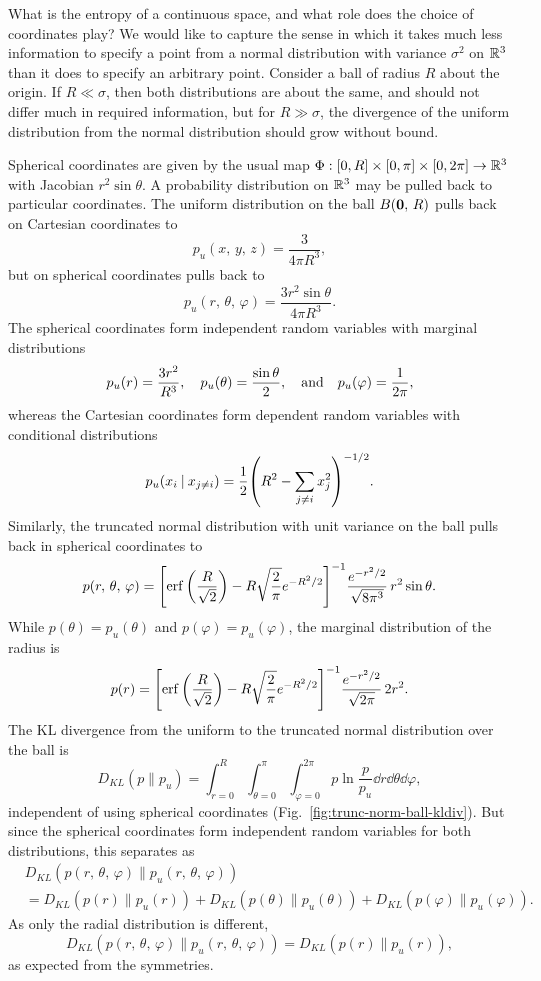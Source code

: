 \documentclass[../notebook.tex]{subfiles}
\begin{document}

What is the entropy of a continuous space, and what role does the choice of
coordinates play? We would like to capture the sense in which it takes much less
information to specify a point from a normal distribution with variance
$\sigma^2$ on $\mathbb{R}^3$ than it does to specify an arbitrary point. Consider a
ball of radius $R$ about the origin. If $R \ll \sigma$, then both distributions
are about the same, and should not differ much in required information, but for
$R \gg \sigma$, the divergence of the uniform distribution from the normal
distribution should grow without bound.

Spherical coordinates are given by the usual map $\Phi:[0,R] \times [0,\pi]
\times [0,2\pi] \to \mathbb{R}^3$ with Jacobian $r^2 \sin\theta$. A probability
distribution on $\mathbb{R}^3$ may be pulled back to particular coordinates. The
uniform distribution on the ball $B(\vb{0},\, R)$ pulls back on Cartesian
coordinates to
\[
  p_u(x,\, y,\, z)
  = \frac{3}{4\pi R^3},
\]
but on spherical coordinates pulls back to
\[
  p_u(r,\, \theta,\, \varphi)
  = \frac{3r^2 \sin\theta}{4\pi R^3}.
\]
The spherical coordinates form independent random variables with marginal
distributions
\[
  p_u(r)
  = \frac{3r^2}{R^3} \qc
  p_u(\theta)
  = \frac{\sin\theta}{2}, \qand
  p_u(\varphi)
  = \frac{1}{2\pi},
\]
whereas the Cartesian coordinates form dependent random variables with
conditional distributions
\[
  p_u(x_i \mathbin{|} x_{j \ne i})
  = \frac{1}{2}{\qty(R^2 - \sum_{j \ne i} x_j^2)}^{-1/2}.
\]
Similarly, the truncated normal distribution with unit variance on the ball
pulls back in spherical coordinates to
\[
  p(r,\, \theta,\, \varphi)
  = {\qty[\mathop{\mathrm{erf}}\qty(\frac{R}{\sqrt{2}})
  - R\sqrt{\frac{2}{\pi}}e^{-R^2 / 2}]}^{-1}
  \frac{e^{-r^2 / 2}}{\sqrt{8\pi^3}}\, r^2 \sin\theta.
\]
While $p(\theta) = p_u(\theta)$ and $p(\varphi) = p_u(\varphi)$, the marginal
distribution of the radius is
\[
  p(r)
  = {\qty[\mathop{\mathrm{erf}}\qty(\frac{R}{\sqrt{2}})
  - R\sqrt{\frac{2}{\pi}}e^{-R^2 / 2}]}^{-1}
  \frac{e^{-r^2 / 2}}{\sqrt{2\pi}}\, 2r^2.
\]
The KL divergence from the uniform to the truncated normal distribution over the
ball is
\[
  D_{KL}(p \mathbin\| p_u)
  = \int_{r=0}^R \int_{\theta=0}^\pi \int_{\varphi=0}^{2\pi} p \ln
  \frac{p}{p_u} \dd{r}\dd{\theta}\dd{\varphi},
\]
independent of using spherical coordinates
(Fig.~\ref{fig:trunc-norm-ball-kldiv}). But since the spherical coordinates form
independent random variables for both distributions, this separates as
\begin{align}
  &D_{KL}(p(r,\, \theta,\, \varphi) \mathbin\| p_u(r,\, \theta,\, \varphi)) \\
  &= D_{KL}(p(r) \mathbin\| p_u(r))
  + D_{KL}(p(\theta) \mathbin\| p_u(\theta))
  + D_{KL}(p(\varphi) \mathbin\| p_u(\varphi)).
\end{align}
As only the radial distribution is different,
\[
  D_{KL}(p(r,\, \theta,\, \varphi) \mathbin\| p_u(r,\, \theta,\, \varphi))
  = D_{KL}(p(r) \mathbin\| p_u(r)),
\]
as expected from the symmetries.
\end{document}
